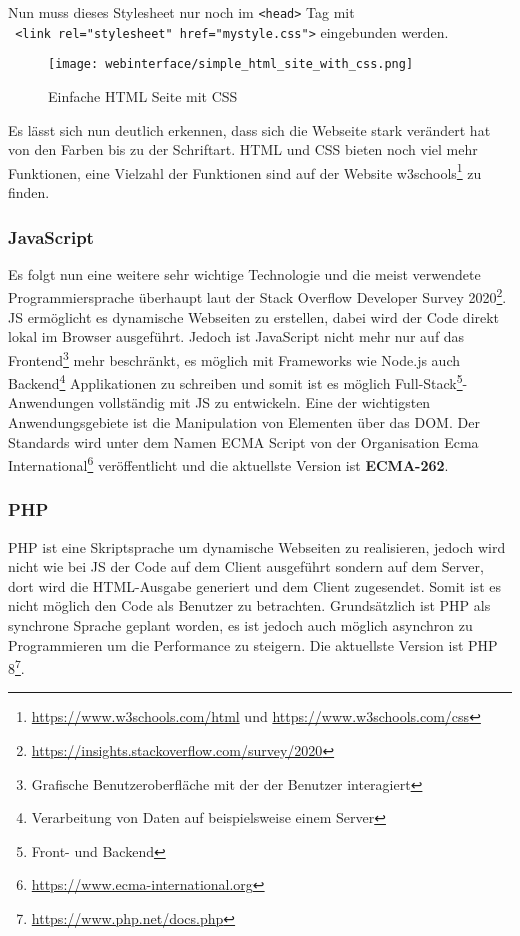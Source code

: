 Nun muss dieses Stylesheet nur noch im \verb|<head>| Tag mit\\
\texttt{  <link rel="stylesheet" href="mystyle.css">} eingebunden
werden.

\begin{figure}[H]
  \centering
  \texttt{[image: webinterface/simple\_html\_site\_with\_css.png]}
  \caption{Einfache HTML Seite mit CSS}
\end{figure}

Es lässt sich nun deutlich erkennen, dass sich die Webseite stark verändert hat
von den Farben bis zu der Schriftart. HTML und CSS bieten noch viel mehr
Funktionen, eine Vielzahl der Funktionen sind auf der Website
w3schools\footnote{\url{https://www.w3schools.com/html} und
\url{https://www.w3schools.com/css}} zu finden.

\subsubsection{JavaScript}
Es folgt nun eine weitere sehr wichtige Technologie und die meist verwendete
Programmiersprache überhaupt laut der Stack Overflow Developer Survey
2020\footnote{\url{https://insights.stackoverflow.com/survey/2020}}. \ac*{JS}
ermöglicht es dynamische Webseiten zu erstellen, dabei wird der Code direkt
lokal im Browser ausgeführt. Jedoch ist JavaScript nicht mehr nur auf das
Frontend\footnote{Grafische Benutzeroberfläche mit der der Benutzer interagiert}
mehr beschränkt, es möglich mit Frameworks wie Node.js auch
Backend\footnote{Verarbeitung von Daten auf beispielsweise einem Server}
Applikationen zu schreiben und somit ist es möglich Full-Stack\footnote{Front-
und Backend}-Anwendungen vollständig mit
\acl*{JS} zu entwickeln. Eine der wichtigsten Anwendungsgebiete ist die
Manipulation von Elementen über das \ac*{DOM}. Der Standards wird unter dem
Namen ECMA Script von der Organisation Ecma
International\footnote{\url{https://www.ecma-international.org}}
veröffentlicht und die aktuellste Version ist
\textbf{ECMA-262}.

\subsubsection{PHP}
\ac*{PHP} ist eine Skriptsprache um dynamische Webseiten zu realisieren, jedoch
wird nicht wie bei \acl*{JS} der Code auf dem Client ausgeführt sondern auf dem
Server, dort wird die HTML-Ausgabe generiert und dem Client zugesendet.
Somit ist es nicht möglich den Code als Benutzer zu betrachten. Grundsätzlich
ist PHP als synchrone Sprache geplant worden, es ist jedoch auch möglich
asynchron zu Programmieren um die Performance zu steigern. Die aktuellste
Version ist \acs*{PHP} 8\footnote{\url{https://www.php.net/docs.php}}.


